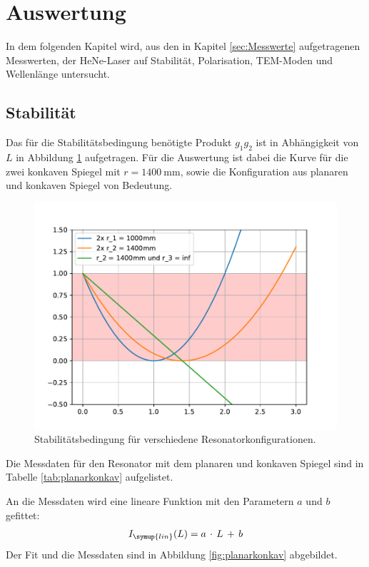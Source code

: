 \section{Auswertung}
\label{sec:Auswertung}

\raggedright

In dem folgenden Kapitel wird, aus den in Kapitel \ref{sec:Messwerte} aufgetragenen
Messwerten, der HeNe-Laser auf Stabilität, Polarisation, TEM-Moden und Wellenlänge untersucht.

\subsection{Stabilität}

Das für die Stabilitätsbedingung benötigte Produkt $g_1g_2$ ist in Abhängigkeit von $L$ in
Abbildung \ref{fig:vorbereitung} aufgetragen. Für die Auswertung ist dabei die Kurve für die zwei
konkaven Spiegel mit $r=\SI{1400}{\milli\meter}$, sowie die Konfiguration aus planaren und konkaven
Spiegel von Bedeutung.

\begin{figure}[H]
  \centering
  \includegraphics{vorbereitung.pdf}
  \caption{Stabilitätsbedingung für verschiedene Resonatorkonfigurationen.}
  \label{fig:vorbereitung}
\end{figure}

Die Messdaten für den Resonator mit dem planaren und konkaven Spiegel sind in Tabelle \ref{tab:planarkonkav}
aufgelistet.

An die Messdaten wird eine lineare Funktion mit den Parametern $a$ und $b$ gefittet:
\begin{align}
  I_{\symup{lin}}(L) = a\,\cdot\,L\,+\,b
\end{align}
Der Fit und die Messdaten sind in Abbildung \ref{fig:planarkonkav} abgebildet.


